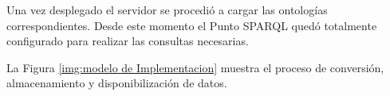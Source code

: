 Una vez desplegado el servidor se procedió a cargar las ontologías correspondientes. Desde este momento el Punto SPARQL quedó totalmente configurado para realizar las consultas necesarias.

La Figura \ref{img:modelo de Implementacion} muestra el proceso de conversión, almacenamiento y disponibilización de datos.
